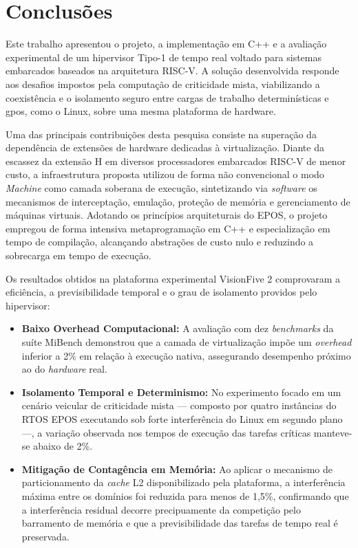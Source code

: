 \chapter{Conclusões}

Este trabalho apresentou o projeto, a implementação em C++ e a avaliação experimental de um hipervisor Tipo-1 de tempo real voltado para sistemas embarcados baseados na arquitetura RISC-V.
A solução desenvolvida responde aos desafios impostos pela computação de criticidade mista, viabilizando a coexistência e o isolamento seguro entre cargas de trabalho determinísticas
e \gls{gpos}, como o Linux, sobre uma mesma plataforma de hardware.

Uma das principais contribuições desta pesquisa consiste na superação da dependência de extensões de hardware dedicadas à virtualização. Diante da escassez da extensão H em diversos
processadores embarcados RISC-V de menor custo, a infraestrutura proposta utilizou de forma não convencional o modo \textit{Machine} como camada soberana de execução,
sintetizando via \textit{software} os mecanismos de interceptação, emulação, proteção de memória e gerenciamento de máquinas virtuais. Adotando os princípios arquiteturais do EPOS,
o projeto empregou de forma intensiva metaprogramação em C++ e especialização em tempo de compilação, alcançando abstrações de custo nulo e reduzindo a sobrecarga em tempo de execução.

Os resultados obtidos na plataforma experimental VisionFive 2 comprovaram a eficiência, a previsibilidade temporal e o grau de isolamento providos pelo hipervisor:

\begin{itemize}
    \item \textbf{Baixo Overhead Computacional:} A avaliação com dez \textit{benchmarks} da suíte MiBench demonstrou que a camada de virtualização impõe um \textit{overhead}
    inferior a 2\% em relação à execução nativa, assegurando desempenho próximo ao do \textit{hardware} real.

    \item \textbf{Isolamento Temporal e Determinismo:} No experimento focado em um cenário veicular de criticidade mista — composto por quatro instâncias do RTOS EPOS executando sob forte
    interferência do Linux em segundo plano —, a variação observada nos tempos de execução das tarefas críticas manteve-se abaixo de 2\%.

    \item \textbf{Mitigação de Contagência em Memória:} Ao aplicar o mecanismo de particionamento da \textit{cache} L2 disponibilizado pela plataforma, a interferência máxima
    entre os domínios foi reduzida para menos de 1,5\%, confirmando que a interferência residual decorre precipuamente da competição pelo barramento de memória e que a previsibilidade das
    tarefas de tempo real é preservada.
\end{itemize}

